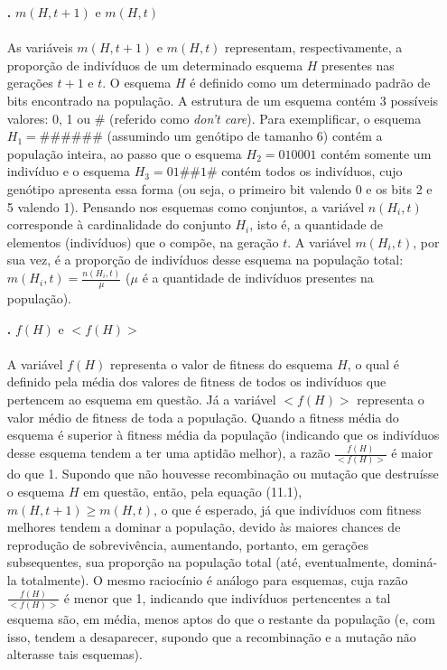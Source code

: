 \documentclass{report}
\begin{document}
\begin{itemize}

\item[\textbf{.}] $m(H, t+1)$ e $m(H,t)$

\paragraph{} As variáveis $m(H, t+1)$ e $m(H,t)$ representam, respectivamente, a proporção de indivíduos de um determinado esquema $H$ presentes nas gerações $t+1$ e $t$. O esquema $H$ é definido como um determinado padrão de bits encontrado na população. A estrutura de um esquema contém 3 possíveis valores: 0, 1 ou \# (referido como \textit{don't care}). Para exemplificar, o esquema $H_1 = \#\#\#\#\#\#$ (assumindo um genótipo de tamanho 6) contém a população inteira, ao passo que o esquema $H_2 = 010001$ contém somente um indivíduo e o esquema $H_3 = 01\#\#1\#$ contém todos os indivíduos, cujo genótipo apresenta essa forma (ou seja, o primeiro bit valendo 0 e os bits 2 e 5 valendo 1). Pensando nos esquemas como conjuntos, a variável $n(H_i, t)$ corresponde à cardinalidade do conjunto $H_i$, isto é, a quantidade de elementos (indivíduos) que o compõe, na geração $t$. A variável $m(H_i, t)$, por sua vez, é a proporção de indivíduos desse esquema na população total: $m(H_i, t) = \frac{n(H_i, t)}{\mu}$ ($\mu$ é a quantidade de indivíduos presentes na população).

\item[\textbf{.}] $f(H)$ e $<f(H)>$

\paragraph{} A variável $f(H)$ representa o valor de fitness do esquema $H$, o qual é definido pela média dos valores de fitness de todos os indivíduos que pertencem ao esquema em questão. Já a variável $<f(H)>$ representa o valor médio de fitness de toda a população. Quando a fitness média do esquema é superior à fitness média da população (indicando que os indivíduos desse esquema tendem a ter uma aptidão melhor), a razão $\frac{f(H)}{<f(H)>}$ é maior do que 1. Supondo que não houvesse recombinação ou mutação que destruísse o esquema $H$ em questão, então, pela equação (11.1), $m(H,t+1) \geq m(H,t)$, o que é esperado, já que indivíduos com fitness melhores tendem a dominar a população, devido às maiores chances de reprodução de sobrevivência, aumentando, portanto, em gerações subsequentes, sua proporção na população total (até, eventualmente, dominá-la totalmente). O mesmo raciocínio é análogo para esquemas, cuja razão $\frac{f(H)}{<f(H)>}$ é menor que 1, indicando que indivíduos pertencentes a tal esquema são, em média, menos aptos do que o restante da população (e, com isso, tendem a desaparecer, supondo que a recombinação e a mutação não alterasse tais esquemas).


\end{itemize}
\end{document}
